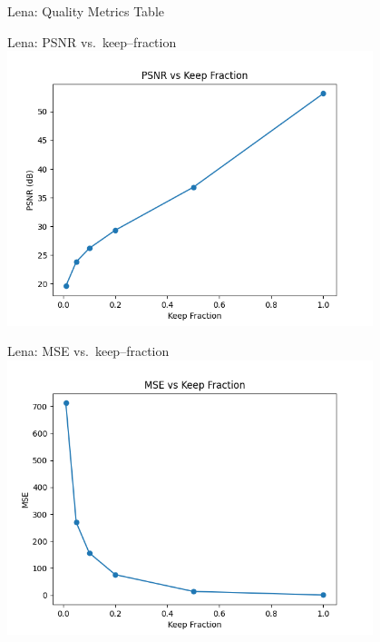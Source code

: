 \documentclass[12pt]{beamer}
\begin{document}
\begin{frame}[fragile]{Lena: Quality Metrics Table}
  \scriptsize
  \centering
\end{frame}

\begin{frame}{Lena: PSNR vs.\ keep–fraction}
  \centering
  \includegraphics[width=0.8\textwidth]{psnr_vs_keep_Lena.png}
\end{frame}

\begin{frame}{Lena: MSE vs.\ keep–fraction}
  \centering
  \includegraphics[width=0.8\textwidth]{mse_vs_keep_Lena.png}
\end{frame}
\end{document}
